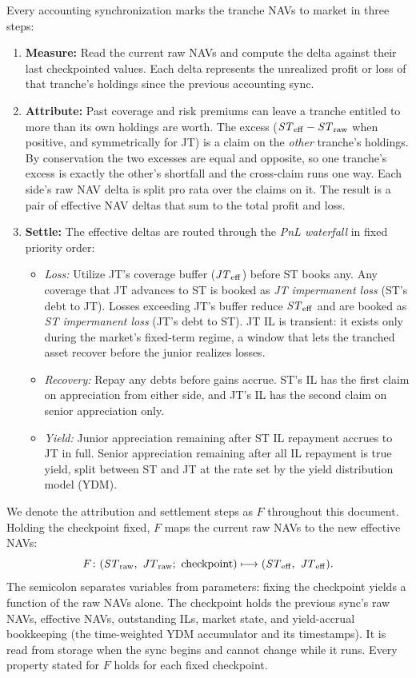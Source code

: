 Every accounting synchronization marks the tranche NAVs to market in three steps:

\begin{enumerate}
  \item \textbf{Measure:} Read the current raw NAVs and
    compute the delta against their last checkpointed values. Each delta
    represents the unrealized profit or loss of that tranche's holdings
    since the previous accounting sync.
  \item \textbf{Attribute:} Past coverage and risk premiums can leave a
    tranche entitled to more than its own holdings are worth. The excess
    ($\mathit{ST}_{\mathrm{eff}} - \mathit{ST}_{\mathrm{raw}}$ when positive, and symmetrically for JT) is a
    claim on the \emph{other} tranche's holdings. By conservation the two
    excesses are equal and opposite, so one tranche's excess is exactly
    the other's shortfall and the cross-claim runs one way. Each side's
    raw NAV delta is split pro rata over the claims on it. The result is
    a pair of effective NAV deltas that sum to the total profit and loss.
  \item \textbf{Settle:} The effective deltas are routed through the
    \emph{PnL waterfall} in fixed priority order:
    \begin{itemize}
      \item \emph{Loss:} Utilize JT's coverage buffer ($\mathit{JT}_{\mathrm{eff}}$) before ST books
        any. Any coverage that JT advances to ST is booked as \emph{JT
        impermanent loss} (ST's debt to JT). Losses exceeding JT's
        buffer reduce $\mathit{ST}_{\mathrm{eff}}$ and are booked as \emph{ST impermanent
        loss} (JT's debt to ST). JT IL is transient: it exists only
        during the market's fixed-term regime, a window that lets the
        tranched asset recover before the junior realizes losses.
      \item \emph{Recovery:} Repay any debts before gains accrue.
        ST's IL has the first claim on appreciation from either side,
        and JT's IL has the second claim on senior appreciation only.
      \item \emph{Yield:} Junior appreciation remaining after ST IL
        repayment accrues to JT in full. Senior appreciation remaining
        after all IL repayment is true yield, split between ST and JT
        at the rate set by the yield distribution model (YDM).
    \end{itemize}
\end{enumerate}

We denote the attribution and settlement steps as $F$ throughout this
document. Holding the checkpoint fixed, $F$ maps the current raw NAVs
to the new effective NAVs:
\[
  F\colon (\mathit{ST}_{\mathrm{raw}},\ \mathit{JT}_{\mathrm{raw}};\ \text{checkpoint}) \longmapsto (\mathit{ST}_{\mathrm{eff}},\ \mathit{JT}_{\mathrm{eff}}).
\]
The semicolon separates variables from parameters: fixing the
checkpoint yields a function of the raw NAVs alone. The checkpoint holds the previous sync's raw NAVs,
effective NAVs, outstanding ILs, market state, and yield-accrual
bookkeeping (the time-weighted YDM accumulator and its timestamps). It
is read from storage when the sync begins and cannot change while it
runs. Every property stated for $F$ holds for each fixed checkpoint.

